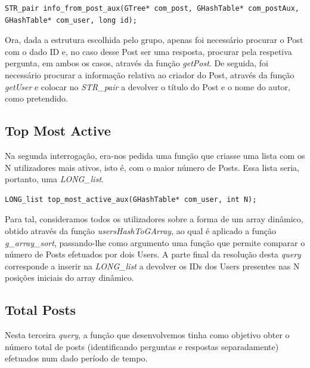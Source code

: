\documentclass[a4paper, 11pt, oneside]{article}
\begin{document}
\begin{lstlisting}[caption=Query 1 - assinatura da função auxiliar]
STR_pair info_from_post_aux(GTree* com_post, GHashTable* com_postAux, GHashTable* com_user, long id);
\end{lstlisting}

Ora, dada a estrutura escolhida pelo grupo, apenas foi necessário procurar o Post com o dado ID e, no caso desse Post ser uma resposta, procurar pela respetiva pergunta, em ambos os casos, através da função \textit{getPost}. De seguida, foi necessário procurar a informação relativa ao criador do Post, através da função \textit{getUser} e colocar no \textit{STR\_pair} a devolver o título do Post e o nome do autor, como pretendido.

\subsection{Top Most Active}
Na segunda interrogação, era-nos pedida uma função que criasse uma lista com os N utilizadores mais ativos, isto é, com o maior número de Posts. Essa lista seria, portanto, uma \textit{LONG\_list}.

\begin{lstlisting}[caption=Query 2 - assinatura da função auxiliar]
LONG_list top_most_active_aux(GHashTable* com_user, int N);
\end{lstlisting}

Para tal, consideramos todos os utilizadores sobre a forma de um array dinâmico, obtido através da função \textit{usersHashToGArray}, ao qual é aplicado a função \textit{g\_array\_sort}, passando-lhe como argumento uma função que permite comparar o número de Posts efetuados por dois Users. A parte final da resolução desta \textit{query} corresponde a inserir na \textit{LONG\_list} a devolver os IDs
dos Users presentes nas N posições iniciais do array dinâmico.

\subsection{Total Posts}
Nesta terceira \textit{query}, a função que desenvolvemos tinha como objetivo obter o número
total de posts (identificando perguntas e respostas separadamente) efetuados num dado período de tempo.
\end{document}
